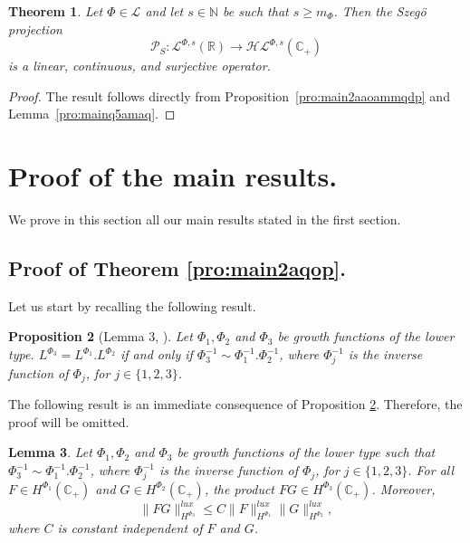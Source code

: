 \documentclass[a4paper,12pt,intlimits,oneside]{amsart}
\newtheorem{theorem}{Theorem}[section]
\newtheorem{proposition}[theorem]{Proposition}
\newtheorem{lemme}[theorem]{Lemma}
\theoremstyle{definition}
\numberwithin{equation}{section}
\theoremstyle{definition}
\begin{document}
\begin{theorem}\label{thm:szego_projection_surjective}
Let $\Phi \in \mathscr{L}$ and let $s \in \mathbb{N}$ be such that $s \ge m_{\Phi}$. 
Then the Szeg\"o projection
\[
\mathcal{P}_{S} : \mathcal{L}^{\Phi,s}(\mathbb{R}) \longrightarrow \mathcal{H}\mathcal{L}^{\Phi,s}(\mathbb{C}_{+})
\]
is a linear, continuous, and surjective operator.
\end{theorem}

\begin{proof}
The result follows directly from Proposition~\ref{pro:main2aaoammqdp} and Lemma~\ref{pro:mainq5amaq}.
\end{proof}



\section{Proof of the main results.} 
We prove in this section all our main results stated in the first section.

\subsection{Proof of Theorem \ref{pro:main2aqop}.} 


\medskip

\noindent
Let us start by recalling the following result.


\begin{proposition}[Lemma 3, \cite{voltiko}]\label{pro:main 5aqaq2pl}
Let  $\Phi_{1}, \Phi_{2}$ and $\Phi_{3}$  be growth functions of the lower type. $L^{\Phi_{3}}=L^{\Phi_{1}}.L^{\Phi_{2}}$ if and only if  $\Phi_{3}^{-1} \sim \Phi_{1}^{-1}.\Phi_{2}^{-1}$,  where  $\Phi_{j}^{-1}$ is the inverse function of  $\Phi_{j}$, for  $j\in \{1,2,3\}$. 
\end{proposition}

The following result is an immediate consequence of Proposition \ref{pro:main 5aqaq2pl}. Therefore, the proof will be omitted.

\begin{lemme}\label{pro:main 5aqp1aqqq2pl}
Let  $\Phi_{1}, \Phi_{2}$ and $\Phi_{3}$  be growth functions of the lower type such that  $\Phi_{3}^{-1} \sim \Phi_{1}^{-1}.\Phi_{2}^{-1}$,  where  $\Phi_{j}^{-1}$ is the inverse function of  $\Phi_{j}$, for  $j\in \{1,2,3\}$.  For all  $F\in   H^{\Phi_{1}}(\mathbb{C}_{+})$ and  $G\in   H^{\Phi_{2}}(\mathbb{C}_{+})$, the product   $FG \in H^{\Phi_{3}}(\mathbb{C}_{+})$. Moreover,  
\begin{equation}\label{eq:eaamqq1}
\|FG\|_{H^{\Phi_{3}}}^{lux} \leq C \|F\|_{H^{\Phi_{1}}}^{lux}\|G\|_{H^{\Phi_{2}}}^{lux}, 
\end{equation}
where $C$ is constant independent of $F$ and $G$.  
\end{lemme}
\end{document}
